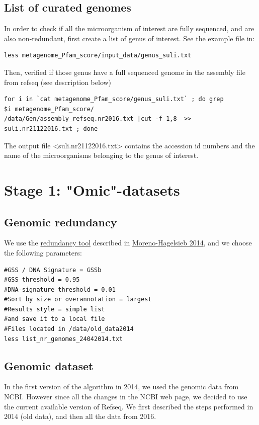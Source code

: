 \documentclass[12pt]{report}
\begin{document}
\subsection{List of curated genomes}

In order to check if all the  microorganism of interest are fully sequenced, and are also non-redundant, first create a list of genus of interest. See the example file in: 
\begin{verbatim}
less metagenome_Pfam_score/input_data/genus_suli.txt
\end{verbatim}

Then, verified if those genus have a full  sequenced genome in the 
assembly file from refseq (see description below)
\begin{verbatim}
for i in `cat metagenome_Pfam_score/genus_suli.txt` ; do grep 
$i metagenome_Pfam_score/
/data/Gen/assembly_refseq.nr2016.txt |cut -f 1,8  >> suli.nr21122016.txt ; done
\end{verbatim}

The output file <suli.nr21122016.txt> contains the accession id numbers and the name of the microorganisms belonging to the genus of interest. 

\section{Stage 1: "Omic"-datasets}
\label{stage1}


\subsection{Genomic redundancy}
We use the  \href{http://microbiome.wlu.ca/research/redundancy/redundancy.cgi}{redundancy tool}  described in \href{http://bioinformatics.oxfordjournals.org/content/early/2013/02/27/bioinformatics.btt064.full}{Moreno-Hagelsieb 2014}, and we choose the following parameters:
\begin{verbatim}
#GSS / DNA Signature = GSSb
#GSS threshold = 0.95
#DNA-signature threshold = 0.01
#Sort by size or overannotation = largest
#Results style = simple list
#and save it to a local file 
#Files located in /data/old_data2014
less list_nr_genomes_24042014.txt  
\end{verbatim}

\subsection{Genomic dataset}
In the first version of the algorithm in 2014, we used the genomic data from NCBI. However since all the changes in the NCBI web page, we decided to use the current available version of Refseq. We first described the steps performed in 2014 (old data), and then all the data from 2016.
\end{document}
